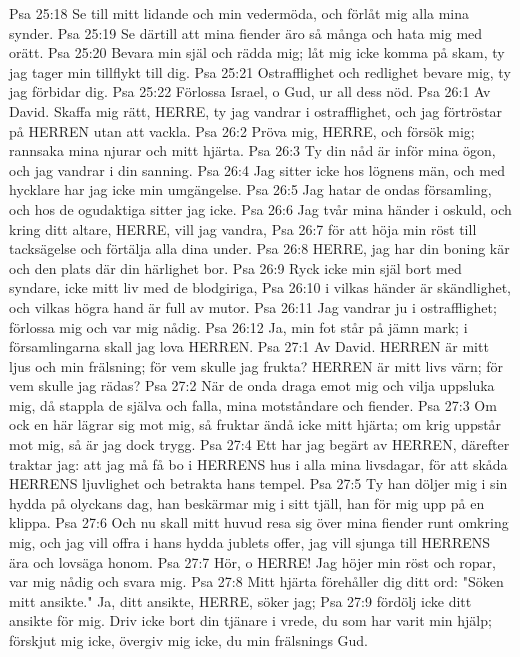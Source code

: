 Psa 25:18  Se till mitt lidande och min vedermöda, och förlåt mig alla mina synder.
Psa 25:19  Se därtill att mina fiender äro så många och hata mig med orätt.
Psa 25:20  Bevara min själ och rädda mig; låt mig icke komma på skam, ty jag tager min tillflykt till dig.
Psa 25:21  Ostrafflighet och redlighet bevare mig, ty jag förbidar dig.
Psa 25:22  Förlossa Israel, o Gud, ur all dess nöd.
Psa 26:1  Av David. Skaffa mig rätt, HERRE, ty jag vandrar i ostrafflighet, och jag förtröstar på HERREN utan att vackla.
Psa 26:2  Pröva mig, HERRE, och försök mig; rannsaka mina njurar och mitt hjärta.
Psa 26:3  Ty din nåd är inför mina ögon, och jag vandrar i din sanning.
Psa 26:4  Jag sitter icke hos lögnens män, och med hycklare har jag icke min umgängelse.
Psa 26:5  Jag hatar de ondas församling, och hos de ogudaktiga sitter jag icke.
Psa 26:6  Jag tvår mina händer i oskuld, och kring ditt altare, HERRE, vill jag vandra,
Psa 26:7  för att höja min röst till tacksägelse och förtälja alla dina under.
Psa 26:8  HERRE, jag har din boning kär och den plats där din härlighet bor.
Psa 26:9  Ryck icke min själ bort med syndare, icke mitt liv med de blodgiriga,
Psa 26:10  i vilkas händer är skändlighet, och vilkas högra hand är full av mutor.
Psa 26:11  Jag vandrar ju i ostrafflighet; förlossa mig och var mig nådig.
Psa 26:12  Ja, min fot står på jämn mark; i församlingarna skall jag lova HERREN.
Psa 27:1  Av David. HERREN är mitt ljus och min frälsning; för vem skulle jag frukta? HERREN är mitt livs värn; för vem skulle jag rädas?
Psa 27:2  När de onda draga emot mig och vilja uppsluka mig, då stappla de själva och falla, mina motståndare och fiender.
Psa 27:3  Om ock en här lägrar sig mot mig, så fruktar ändå icke mitt hjärta; om krig uppstår mot mig, så är jag dock trygg.
Psa 27:4  Ett har jag begärt av HERREN, därefter traktar jag: att jag må få bo i HERRENS hus i alla mina livsdagar, för att skåda HERRENS ljuvlighet och betrakta hans tempel.
Psa 27:5  Ty han döljer mig i sin hydda på olyckans dag, han beskärmar mig i sitt tjäll, han för mig upp på en klippa.
Psa 27:6  Och nu skall mitt huvud resa sig över mina fiender runt omkring mig, och jag vill offra i hans hydda jublets offer, jag vill sjunga till HERRENS ära och lovsäga honom.
Psa 27:7  Hör, o HERRE! Jag höjer min röst och ropar, var mig nådig och svara mig.
Psa 27:8  Mitt hjärta förehåller dig ditt ord: "Söken mitt ansikte." Ja, ditt ansikte, HERRE, söker jag;
Psa 27:9  fördölj icke ditt ansikte för mig. Driv icke bort din tjänare i vrede, du som har varit min hjälp; förskjut mig icke, övergiv mig icke, du min frälsnings Gud.
